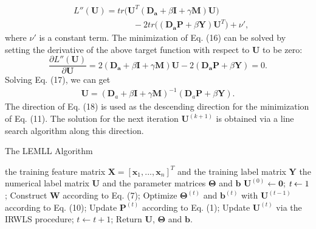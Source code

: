 \documentclass[conference]{IEEEtran}
\begin{document}
\begin{equation}
\begin{split}
&L''(\bm{U})=tr\big(\bm{U}^T(\bm{D_a}+\beta\bm{I}+\gamma \bm{M})\bm{U}\big)\\
&\quad\quad\quad\quad\quad\quad\quad -2tr\big((\bm{D_a}\bm{P}+\beta \bm{Y})\bm{U}^T\big) + \nu',
\end{split}
\end{equation}
where $\nu'$ is a constant term. The minimization of Eq. (16) can be solved by setting the derivative of the above target function with respect to $\bm{U}$ to be zero:
\begin{equation}
\frac{\partial L''(\bm{U})}{\partial \bm{U}}=2(\bm{D_a}+\beta\bm{I}+\gamma \bm{M})\bm{U}-2(\bm{D_a}\bm{P}+\beta \bm{Y})=0.
\end{equation}
Solving Eq. (17), we can get
\begin{equation}
\begin{split}
\bm{U}=(\bm{D}_a+\beta\bm{I}+\gamma\bm{M})^{-1}(\bm{D}_a\bm{P}+\beta\bm{Y}).
\end{split}
\end{equation}
The direction of Eq. (18) is used as the descending direction for the minimization of Eq. (11). The solution for the next iteration $\bm{U}^{(k+1)}$ is obtained via a line search algorithm along this direction.

\renewcommand{\algorithmicrequire}{ \textbf{Input:}} %
\renewcommand{\algorithmicensure}{ \textbf{Output:}} %
\begin{algorithm}[h]
  \caption{The LEMLL Algorithm}
  \begin{algorithmic}[1]
    \REQUIRE
      the training feature matrix $\bm{X}=[\bm{x}_1,...,\bm{x}_n]^T$ and the training label matrix $\bm{Y}$
    \ENSURE
      the numerical label matrix $\bm{U}$ and the parameter matrices $\bm{\Theta}$ and $\bm{b}$
    \STATE $\bm{U}^{(0)}\leftarrow\bm{0}$; $\emph{t}\leftarrow 1$;
    \STATE Construct $\bm{W}$ according to Eq. (7);
    \REPEAT
      \STATE Optimize $\bm{\Theta}^{(t)}$ and $\bm{b}^{(t)}$ with $\bm{U}^{(t-1)}$ according to Eq. (10);
      \STATE Update $\bm{P}^{(t)}$ according to Eq. (1);
      \STATE Update $\bm{U}^{(t)}$ via the IRWLS procedure;
      \STATE $t\leftarrow t+1$;
    \STATE Return $\bm{U}$, $\bm{\Theta}$ and $\bm{b}$.
  \end{algorithmic}
\end{algorithm}
\end{document}
